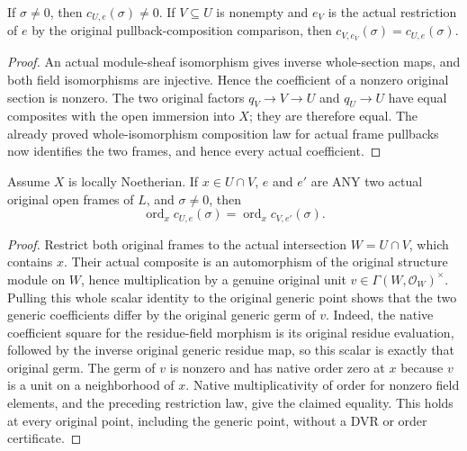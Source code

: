 \begin{lemma}
\label{lem:curve-generic-section-coefficient-restriction}
\leanok
{}
If $\sigma\ne0$, then $c_{U,e}(\sigma)\ne0$.  If $V\subseteq U$ is
nonempty and $e_V$ is the actual restriction of $e$ by the original
pullback-composition comparison, then
$c_{V,e_V}(\sigma)=c_{U,e}(\sigma)$.
\end{lemma}
\begin{proof}
An actual module-sheaf isomorphism gives inverse whole-section maps,
and both field isomorphisms are injective.  Hence the coefficient of a
nonzero original section is nonzero.  The two original factors
$q_V\to V\to U$ and $q_U\to U$ have equal composites with the open
immersion into $X$; they are therefore equal.  The already proved
whole-isomorphism composition law for actual frame pullbacks now
identifies the two frames, and hence every actual coefficient.
\end{proof}

\begin{lemma}
\label{lem:curve-generic-section-order-frame-independent}
\leanok
{}
Assume $X$ is locally Noetherian.  If $x\in U\cap V$, $e$ and $e'$ are
ANY two actual original open frames of $L$, and $\sigma\ne0$, then
\[
 \operatorname{ord}_x c_{U,e}(\sigma)
   =\operatorname{ord}_x c_{V,e'}(\sigma).
\]
\end{lemma}
\begin{proof}
Restrict both original frames to the actual intersection $W=U\cap V$,
which contains $x$.  Their actual composite is an automorphism of the
original structure module on $W$, hence multiplication by a genuine
original unit $v\in\Gamma(W,\mathcal O_W)^\times$.  Pulling this whole
scalar identity to the original generic point shows that the two
generic coefficients differ by the original generic germ of $v$.
Indeed, the native coefficient square for the residue-field morphism
is its original residue evaluation, followed by the inverse original
generic residue map, so this scalar is exactly that original germ.
The germ of $v$ is nonzero and has native order zero at $x$ because
$v$ is a unit on a neighborhood of $x$.  Native multiplicativity of
order for nonzero field elements, and the preceding restriction law,
give the claimed equality.  This holds at every original point,
including the generic point, without a DVR or order certificate.
\end{proof}

